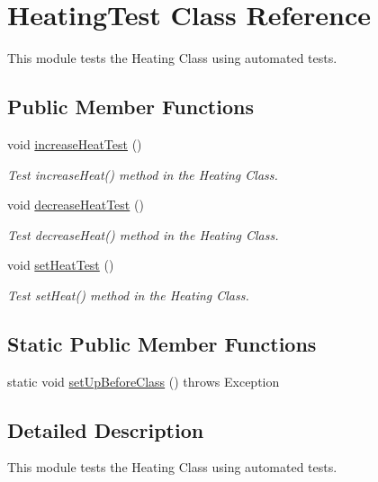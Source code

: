 \hypertarget{class_heating_test}{}\section{Heating\+Test Class Reference}
\label{class_heating_test}


This module tests the Heating Class using automated tests.  


\subsection*{Public Member Functions}
\begin{DoxyCompactItemize}
\item 
void \hyperlink{class_heating_test_a58de8b0a930ebc18eba7781ba44f5be0}{increase\+Heat\+Test} ()
\begin{DoxyCompactList}\small\item\em Test increase\+Heat() method in the Heating Class. \end{DoxyCompactList}\item 
void \hyperlink{class_heating_test_a8661f693ac0d8e3b19e24ca3ecd32265}{decrease\+Heat\+Test} ()
\begin{DoxyCompactList}\small\item\em Test decrease\+Heat() method in the Heating Class. \end{DoxyCompactList}\item 
void \hyperlink{class_heating_test_ad046da1adc408c4487c4065a2c6ba48c}{set\+Heat\+Test} ()
\begin{DoxyCompactList}\small\item\em Test set\+Heat() method in the Heating Class. \end{DoxyCompactList}\end{DoxyCompactItemize}
\subsection*{Static Public Member Functions}
\begin{DoxyCompactItemize}
\item 
static void \hyperlink{class_heating_test_a3f7616c1fb51ca2a18692c409cb36489}{set\+Up\+Before\+Class} ()  throws Exception 
\end{DoxyCompactItemize}


\subsection{Detailed Description}
This module tests the Heating Class using automated tests. 

